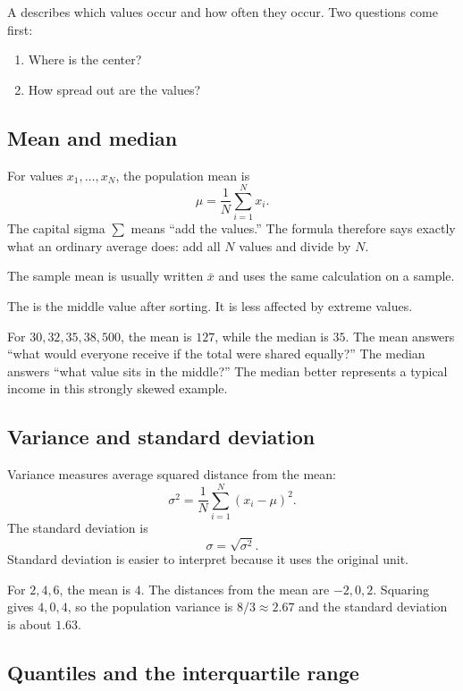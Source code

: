 A  describes which values occur and how often they occur. Two questions come first:

\begin{enumerate}
  \item Where is the center?
  \item How spread out are the values?
\end{enumerate}

\subsection{Mean and median}

For values $x_1,\ldots,x_N$, the population mean is
\[
  \mu=\frac{1}{N}\sum_{i=1}^{N}x_i.
\]
The capital sigma $\sum$ means ``add the values.'' The formula therefore says exactly what an ordinary average does: add all $N$ values and divide by $N$.

The sample mean is usually written $\bar{x}$ and uses the same calculation on a sample.

The  is the middle value after sorting. It is less affected by extreme values.

\begin{workedexample}
For $30,32,35,38,500$, the mean is $127$, while the median is $35$. The mean answers ``what would everyone receive if the total were shared equally?'' The median answers ``what value sits in the middle?'' The median better represents a typical income in this strongly skewed example.
\end{workedexample}

\subsection{Variance and standard deviation}

Variance measures average squared distance from the mean:
\[
  \sigma^2=\frac{1}{N}\sum_{i=1}^{N}(x_i-\mu)^2.
\]
The standard deviation is
\[
  \sigma=\sqrt{\sigma^2}.
\]
Standard deviation is easier to interpret because it uses the original unit.

\begin{workedexample}
For $2,4,6$, the mean is $4$. The distances from the mean are $-2,0,2$. Squaring gives $4,0,4$, so the population variance is $8/3\approx2.67$ and the standard deviation is about $1.63$.
\end{workedexample}

\subsection{Quantiles and the interquartile range}

